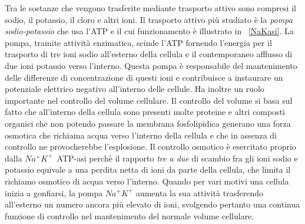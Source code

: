 Tra le sostanze che vengono trasferite mediante trasporto attivo sono compresi il sodio, il potassio, il cloro e altri ioni. Il trasporto attivo più studiato è la \textit{pompa sodio-potassio} che usa l'ATP e il cui funzionamento è illustrato in \figurename~\ref{NaKasi}. La pompa, tramite attività enzimatica, scinde l'ATP fornendo l'energia per il trasporto di tre ioni sodio all'esterno della cellula e il contemporaneo afflusso di due ioni potassio verso l'interno. Questa pompa è responsabile del mantenimento delle differenze di concentrazione di questi ioni e contribuisce a instaurare un potenziale elettrico negativo all'interno delle cellule. Ha inoltre un ruolo importante nel controllo del volume cellulare. Il controllo del volume si basa sul fatto che all'interno della cellula sono presenti molte proteine e altri composti organici che non potendo passare la membrana fosfolipidica generano una forza osmotica che richiama acqua verso l'interno della cellula e che in assenza di controllo ne provocherebbe l'esplosione. Il controllo osmotico è esercitato proprio dalla $Na^+K^+$~ATP-asi perchè il rapporto \textit{tre a due} di scambio fra gli ioni sodio e potassio equivale a una perdita netta di ioni da parte della cellula, che limita il richiamo osmotico di acqua verso l'interno. Quando per vari motivi una cellula inizia a gonfiarsi, la pompa $Na^+K^+$ aumenta la sua attività trasferendo all'esterno un numero ancora più elevato di ioni, svolgendo pertanto una continua funzione di controllo nel mantenimento del normale volume cellulare.

